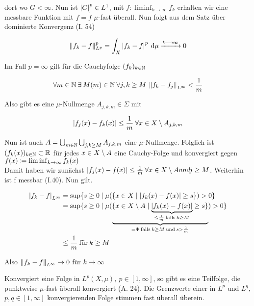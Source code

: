 \documentclass[skript.tex]{subfiles}
\begin{document}
\begin{bem*}
	dort wo $G< \infty$. Nun ist $\left| G \right|^p \in L^1$, mit $f \colon \liminf_{k \to \infty} f_k$ erhalten wir eine messbare Funktion mit $f = \tilde f$ $\mu$-fast überall. Nun folgt aus dem Satz über dominierte Konvergenz (I. 54)
	
	\begin{equation*}
	\left\lVert f_k - f \right\rVert_{L^p}^p = \int_X \left| f_k -f \right|^p \: \mathrm{d} \mu \xrightarrow{k\kern -1pt \longrightarrow \kern -1pt\infty} 0
	\end{equation*}
	
	Im Fall $p= \infty$ gilt für die Cauchyfolge $(f_k)_{k\in\mathbb{N}}$ 
	
	\begin{equation*}
	\forall m \in \mathbb{N} \: \exists \: M(m) \in \mathbb{N} \: \forall j,k \geq M \: \left\lVert f_k - f_j \right\rVert_{L^\infty} < \frac{1}{m}
	\end{equation*}
	
	Also gibt es eine $\mu$-Nullmenge $A_{j,k,m} \in \Sigma$ mit
	
	\begin{equation*}
	\left| f_j(x)- f_k(x) \right| \leq \frac{1}{m} \: \forall x \in X \setminus A_{j,k,m}
	\end{equation*}
	
	Nun ist auch $A = \bigcup_{m\in\mathbb{N}} \bigcup_{j,k \geq M} A_{j,k,m}$ eine $\mu$-Nullmenge.
	Folglich ist $ (f_k(x))_{k\in\mathbb{N}} \subset \mathbb{R}$ für jedes $ x \in X \setminus A$ eine Cauchy-Folge und konvergiert gegen $f(x) \coloneqq \liminf_{k\to\infty} f_k(x)$ \\
	Damit haben wir zunächst $\left| f_j(x) - f(x) \right| \leq \frac{1}{m} \: \forall x \in X \setminus A und j \geq M$. Weiterhin ist f messbar (I.40). Nun gilt.
	
	\begin{align*}
	\left| f_k-f \right|_{L^\infty} &= \sup\{s \geq 0 \mid \mu(\{x\in X \mid \left| f_k(x) - f(x) \right| \geq s \})>0\} \\
	&= \sup\{s \geq 0 \mid \mu( \underbrace{\{x\in X \setminus A \mid \underbrace{\left| f_k(x) - f(x) \right|}_{\leq \frac{1}{m} \: \text{falls} \: k\geq M}  \geq s \}}_{= \Phi \: \text{falls} \: k\geq M \: \text{und} \: s > \frac{1}{m}})>0\} \\
	&\leq \frac{1}{m} \: \text{für} \: k \geq M
	\end{align*}
	
	Also $\left\lVert f_k - f \right\rVert_{L^\infty} \to 0$ für $ k \to \infty $
\end{bem*}

\begin{cor}
	Konvergiert eine Folge in $L^p(X,\mu), \: p \in [ 1,\infty]$, so gibt es eine Teilfolge, die punktweise $\mu$-fast überall konvergiert (A. 24). Die Grenzwerte einer in $L^p$ und $L^q$, $p,q \in [1,\infty]$ konvergierenden Folge stimmen fast überall überein.
\end{cor}
\end{document}
